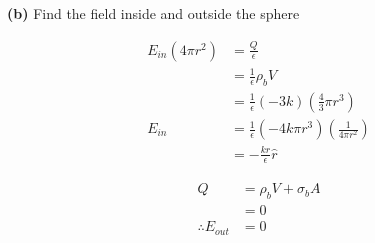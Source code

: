 \documentclass{article}
\begin{document}
\textbf{(b)}
Find the field inside and outside the sphere

\begin{equation*}
\begin{split}
	E_{in} ( 4 \pi r^2 ) & = \frac{Q}{\epsilon} \\
	& = \frac{1}{\epsilon} \rho_b V \\
	& = \frac{1}{\epsilon} ( -3 k ) ( \frac{4}{3} \pi r^3 ) \\
	E_{in} & = \frac{1}{\epsilon} ( - 4 k \pi r^3 ) ( \frac{1}{4 \pi r^2} ) \\
	& = \boxed { - \frac{k r}{\epsilon} \hat{r} }
\end{split}
\end{equation*}

\begin{equation*}
\begin{split}
	Q & = \rho_b V + \sigma_b A \\
	& = 0 \\ 
	\therefore E_{out} & = \boxed { 0 }
\end{split}
\end{equation*}
\end{document}
